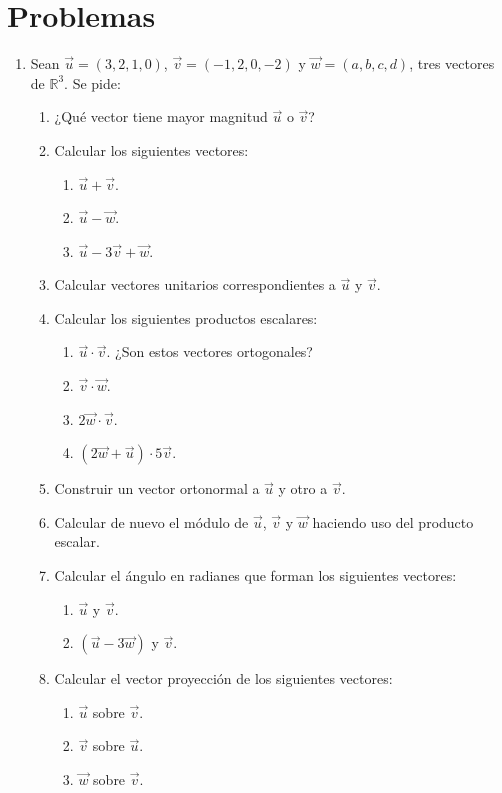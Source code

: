 \documentclass[a4paper]{article}
\begin{document}
\section*{Problemas}
\begin{enumerate}[leftmargin=*]
\item Sean $\vec{u}=(3,2,1,0)$, $\vec{v}=(-1,2,0,-2)$ y $\vec{w}=(a,b,c,d)$, tres
vectores de $\mathbb{R}^3$. Se pide:
\begin{enumerate}
\item ¿Qué vector tiene mayor magnitud $\vec{u}$ o $\vec{v}$?
\item Calcular los siguientes vectores:
\begin{enumerate}
\item $\vec{u}+\vec{v}$.
\item $\vec{u}-\vec{w}$.
\item $\vec{u}-3\vec{v}+\vec{w}$.
\end{enumerate}
\item Calcular vectores unitarios correspondientes a $\vec{u}$ y $\vec{v}$.
\item Calcular los siguientes productos escalares:
\begin{enumerate}
\item $\vec{u}\cdot\vec{v}$. ¿Son estos vectores ortogonales? 
\item $\vec{v}\cdot\vec{w}$.
\item $2\vec{w}\cdot\vec{v}$.
\item $(2\vec{w}+\vec{u})\cdot 5\vec{v}$.
\end{enumerate}

\item Construir un vector ortonormal a $\vec{u}$ y otro a $\vec{v}$.

\item Calcular de nuevo el módulo de $\vec{u}$, $\vec{v}$ y $\vec{w}$ haciendo
uso del producto escalar.

\item Calcular el ángulo en radianes que forman los siguientes vectores:
\begin{enumerate}
\item $\vec{u}$ y $\vec{v}$.
\item $(\vec{u}-3\vec{w})$ y $\vec{v}$.
\end{enumerate}

\item Calcular el vector proyección de los siguientes vectores:
\begin{enumerate}
\item $\vec{u}$ sobre $\vec{v}$.
\item $\vec{v}$ sobre $\vec{u}$.
\item $\vec{w}$ sobre $\vec{v}$.
\end{enumerate}

\end{enumerate}

\end{enumerate}
\end{document}
